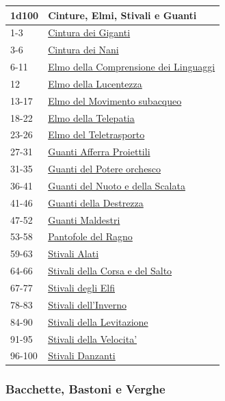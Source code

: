 \begin{multicols}{2}
{{\small\begin{tabularx}{\linewidth}{ll}
	\toprule
\textbf{1d100} & \textbf{Cinture, Elmi, Stivali e Guanti}\\
\toprule
1-3 & \hyperlink{Cintura dei Giganti}{Cintura dei Giganti}\\
3-6 & \hyperlink{Cintura dei Nani}{Cintura dei Nani}\\
6-11 & \hyperlink{Elmo della Comprensione dei Linguaggi}{Elmo della Comprensione dei Linguaggi}\\
12 & \hyperlink{Elmo della Lucentezza}{Elmo della Lucentezza}\\
13-17 & \hyperlink{Elmo del Movimento subacqueo}{Elmo del Movimento subacqueo}\\
18-22 & \hyperlink{Elmo della Telepatia}{Elmo della Telepatia}\\
23-26 & \hyperlink{Elmo del Teletrasporto}{Elmo del Teletrasporto}\\
27-31 & \hyperlink{Guanti Afferra Proiettili}{Guanti Afferra Proiettili}\\
31-35 & \hyperlink{Guanti del Potere orchesco}{Guanti del Potere orchesco}\\
36-41 & \hyperlink{Guanti del Nuoto edella Scalata}{Guanti del Nuoto e della Scalata}\\
41-46 & \hyperlink{Guanti della Destrezza}{Guanti della Destrezza}\\
47-52 & \hyperlink{Guanti Maldestri}{Guanti Maldestri}\\
53-58 & \hyperlink{Pantofole del Ragno}{Pantofole del Ragno}\\
59-63 & \hyperlink{Stivali Alati}{Stivali Alati}\\
64-66 & \hyperlink{Stivali della Corsa e del Salto}{Stivali della Corsa e del Salto}\\
67-77 & \hyperlink{Stivali degli Elfi}{Stivali degli Elfi}\\
78-83 & \hyperlink{Stivali dell'Inverno}{Stivali dell'Inverno}\\
84-90 & \hyperlink{Stivali della Levitazione}{Stivali della Levitazione}\\
91-95 & \hyperlink{Stivalid ella Velocita'}{Stivali della Velocita'}\\
96-100 & \hyperlink{StivaliDanzanti}{Stivali Danzanti}\\
\end{tabularx}}

\subsubsection{Bacchette, Bastoni e Verghe}\hypertarget{bastonibacchette}{}\label{bastonibacchette}

}
\end{multicols}
